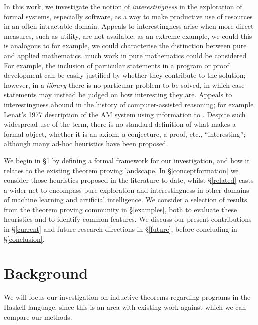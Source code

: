 \documentclass[]{article}
\begin{document}
In this work, we investigate the notion of \emph{interestingness} in the exploration of formal systems, especially software, as a way to make productive use of resources in an often intractable domain. Appeals to interestingness arise when more direct measures, such as utility, are not available; as an extreme example, we could this is analogous to for example, we could characterise the distinction between pure and applied mathematics. much work in pure mathematics could be considered For example, the inclusion of particular statements in a program or proof development can be easily justified by whether they contribute to the solution; however, in a \emph{library} there is no particular problem to be solved, in which case statements may instead be judged on how interesting they are. Appeals to interestingness abound in the history of computer-assisted reasoning; for example Lenat's 1977 description of the AM system using information to  \cite{lenat1977automated}. Despite such widespread use of the term, there is no standard definition of what makes a formal object, whether it is an axiom, a conjecture, a proof, etc., ``interesting''; although many ad-hoc heuristics have been proposed.

We begin in \S \ref{background} by defining a formal framework for our investigation, and how it relates to the existing theorem proving landscape. In \S \ref{conceptformation} we consider those heuristics proposed in the literature to date, whilst \S \ref{related} casts a wider net to encompass pure exploration and interestingness in other domains of machine learning and artificial intelligence. We consider a selection of results from the theorem proving community in \S \ref{examples}, both to evaluate these heuristics and to identify common features. We discuss our present contributions in \S \ref{current} and future research directions in \S \ref{future}, before concluding in \S \ref{conclusion}.

\section{Background}
\label{background}

We will focus our investigation on inductive theorems regarding programs in the Haskell language, since this is an area with existing work \cite{Claessen_hipspec:automating} against which we can compare our methods.
\end{document}

